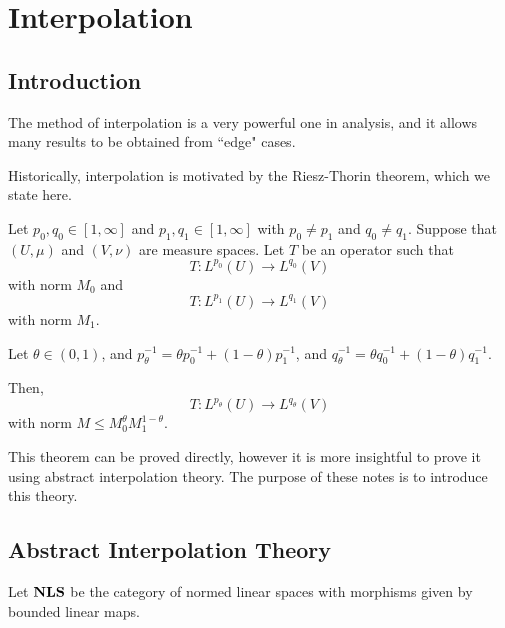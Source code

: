 
\chapter{Interpolation} %

\label{Interpolation} %




\section{Introduction}
The method of interpolation is a very powerful one in analysis,
and it allows many results to be obtained from ``edge" cases.

Historically, interpolation is motivated by the Riesz-Thorin theorem,
which we state here.
\begin{theorem}
    Let $p_0,q_0 \in [1,\infty]$ and $p_1,q_1 \in [1,\infty]$
    with $p_0 \neq p_1$ and $q_0 \neq q_1$. Suppose that $(U,\mu)$
    and $(V,\nu)$ are measure spaces. Let $T$ be an operator such that
    \begin{equation*}
        T:L^{p_0}(U)\rightarrow L^{q_0}(V)
    \end{equation*}
    with norm $M_0$ and
    \begin{equation*}
        T:L^{p_1}(U) \rightarrow L^{q_1}(V)
    \end{equation*}
    with norm $M_1$.
    
    Let $\theta \in (0,1)$, and $p_\theta^{-1} = \theta p_0^{-1}+(1-\theta)p_1^{-1}$,
    and $q_\theta^{-1} = \theta q_0^{-1}+(1-\theta)q_1^{-1}$. 
    
    Then,
    \begin{equation*}
        T:L^{p_\theta}(U)\rightarrow L^{q_\theta}(V)
    \end{equation*}
    with norm $M \leq M_0^{\theta} M_1^{1-\theta}$.
\end{theorem}
This theorem can be proved directly, however it is more insightful to prove it using
abstract interpolation theory. The purpose of these notes is to introduce this theory.


\section{Abstract Interpolation Theory}
Let $\mathrm{\mathbf{NLS}}$ be the category of normed linear spaces with morphisms
given by bounded linear maps.

